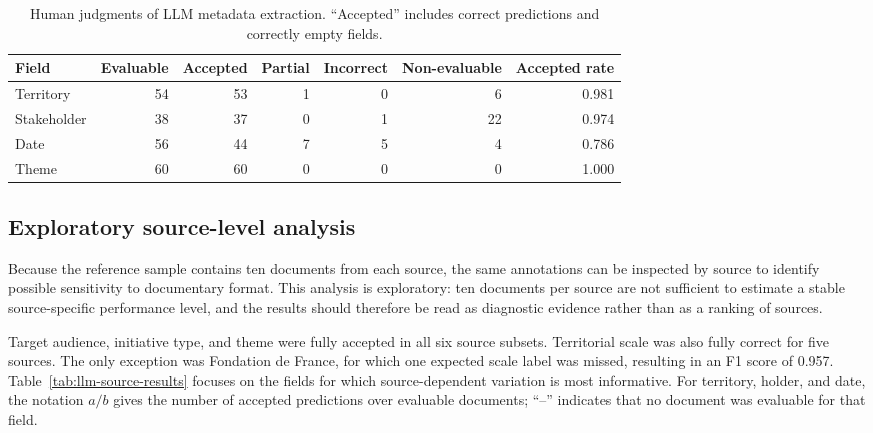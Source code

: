 \begin{table}[H]
\centering
\begin{tabular}{lrrrrrr}
\toprule
Field & Evaluable & Accepted & Partial & Incorrect & Non-evaluable & Accepted rate \\
\midrule
Territory & 54 & 53 & 1 & 0 & 6 & 0.981 \\
Stakeholder & 38 & 37 & 0 & 1 & 22 & 0.974 \\
Date & 56 & 44 & 7 & 5 & 4 & 0.786 \\
Theme & 60 & 60 & 0 & 0 & 0 & 1.000 \\
\bottomrule
\end{tabular}
\caption{Human judgments of LLM metadata extraction. ``Accepted'' includes
correct predictions and correctly empty fields.}
\label{tab:llm-judgment-results}
\end{table}

\subsection{Exploratory source-level analysis}

Because the reference sample contains ten documents from each source, the same
annotations can be inspected by source to identify possible sensitivity to
documentary format. This analysis is exploratory: ten documents per source are
not sufficient to estimate a stable source-specific performance level, and the
results should therefore be read as diagnostic evidence rather than as a ranking
of sources.

Target audience, initiative type, and theme were fully accepted in all six
source subsets. Territorial scale was also fully correct for five sources. The
only exception was Fondation de France, for which one expected scale label was
missed, resulting in an F1 score of 0.957. Table~\ref{tab:llm-source-results}
focuses on the fields for which source-dependent variation is most informative.
For territory, holder, and date, the notation $a/b$ gives the number of accepted
predictions over evaluable documents; ``--'' indicates that no document was
evaluable for that field.

